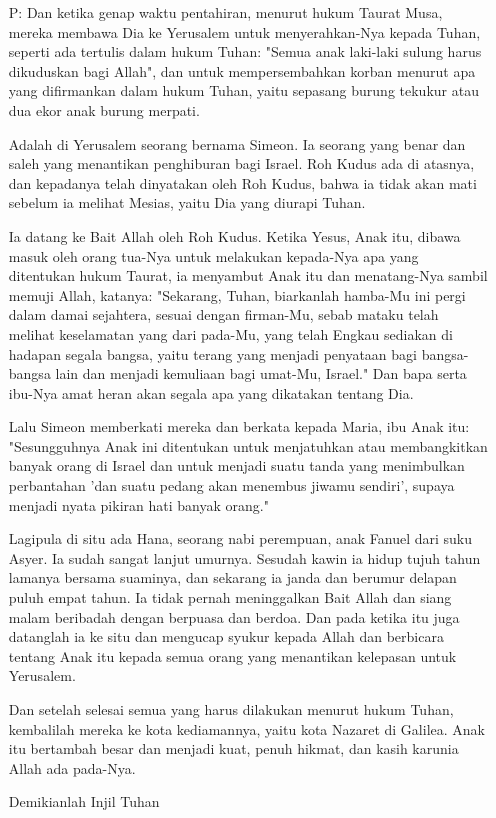 \documentclass[a5paper,12pt,openany]{scrbook}
\newcommand{\BI}[1]{\begin{itemize} \item[P:] #1 \end{itemize}}
\begin{document}
\BI{Dan ketika genap waktu pentahiran, menurut hukum Taurat Musa, mereka membawa Dia ke Yerusalem untuk menyerahkan-Nya kepada Tuhan,
seperti ada tertulis dalam hukum Tuhan: "Semua anak laki-laki sulung harus dikuduskan bagi Allah",
dan untuk mempersembahkan korban menurut apa yang difirmankan dalam hukum Tuhan, yaitu sepasang burung tekukur atau dua ekor anak burung merpati.

Adalah di Yerusalem seorang bernama Simeon. Ia seorang yang benar dan saleh yang menantikan penghiburan bagi Israel. Roh Kudus ada di atasnya,
dan kepadanya telah dinyatakan oleh Roh Kudus, bahwa ia tidak akan mati sebelum ia melihat Mesias, yaitu Dia yang diurapi Tuhan.

Ia datang ke Bait Allah oleh Roh Kudus. Ketika Yesus, Anak itu, dibawa masuk oleh orang tua-Nya untuk melakukan kepada-Nya apa yang ditentukan hukum Taurat,
ia menyambut Anak itu dan menatang-Nya sambil memuji Allah, katanya:
"Sekarang, Tuhan, biarkanlah hamba-Mu ini pergi dalam damai sejahtera, sesuai dengan firman-Mu,
sebab mataku telah melihat keselamatan yang dari pada-Mu,
yang telah Engkau sediakan di hadapan segala bangsa,
yaitu terang yang menjadi penyataan bagi bangsa-bangsa lain dan menjadi kemuliaan bagi umat-Mu, Israel."
Dan bapa serta ibu-Nya amat heran akan segala apa yang dikatakan tentang Dia.

Lalu Simeon memberkati mereka dan berkata kepada Maria, ibu Anak itu: "Sesungguhnya Anak ini ditentukan untuk menjatuhkan atau membangkitkan banyak orang di Israel dan untuk menjadi suatu tanda yang menimbulkan perbantahan
'dan suatu pedang akan menembus jiwamu sendiri', supaya menjadi nyata pikiran hati banyak orang."

Lagipula di situ ada Hana, seorang nabi perempuan, anak Fanuel dari suku Asyer. Ia sudah sangat lanjut umurnya. 
Sesudah kawin ia hidup tujuh tahun lamanya bersama suaminya,
dan sekarang ia janda dan berumur delapan puluh empat tahun. Ia tidak pernah meninggalkan Bait Allah dan siang malam beribadah dengan berpuasa dan berdoa.
Dan pada ketika itu juga datanglah ia ke situ dan mengucap syukur kepada Allah dan berbicara tentang Anak itu kepada semua orang yang menantikan kelepasan untuk Yerusalem.

Dan setelah selesai semua yang harus dilakukan menurut hukum Tuhan, kembalilah mereka ke kota kediamannya, yaitu kota Nazaret di Galilea.
Anak itu bertambah besar dan menjadi kuat, penuh hikmat, dan kasih karunia Allah ada pada-Nya.

Demikianlah Injil Tuhan
}
\end{document}
